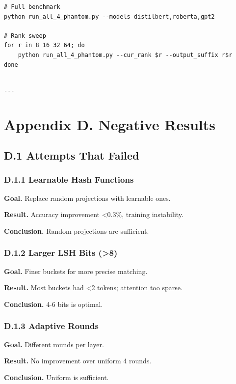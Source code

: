 \begin{lstlisting}
# Full benchmark
python run_all_4_phantom.py --models distilbert,roberta,gpt2

# Rank sweep
for r in 8 16 32 64; do
    python run_all_4_phantom.py --cur_rank $r --output_suffix r$r
done
\end{lstlisting}
\begin{lstlisting}

---
\end{lstlisting}


\section{Appendix D. Negative Results}

\subsection{D.1 Attempts That Failed}

\subsubsection{D.1.1 Learnable Hash Functions}

\textbf{Goal.} Replace random projections with learnable ones.

\textbf{Result.} Accuracy improvement <0.3\%, training instability.

\textbf{Conclusion.} Random projections are sufficient.

\subsubsection{D.1.2 Larger LSH Bits (>8)}

\textbf{Goal.} Finer buckets for more precise matching.

\textbf{Result.} Most buckets had <2 tokens; attention too sparse.

\textbf{Conclusion.} 4-6 bits is optimal.

\subsubsection{D.1.3 Adaptive Rounds}

\textbf{Goal.} Different rounds per layer.

\textbf{Result.} No improvement over uniform 4 rounds.

\textbf{Conclusion.} Uniform is sufficient.

